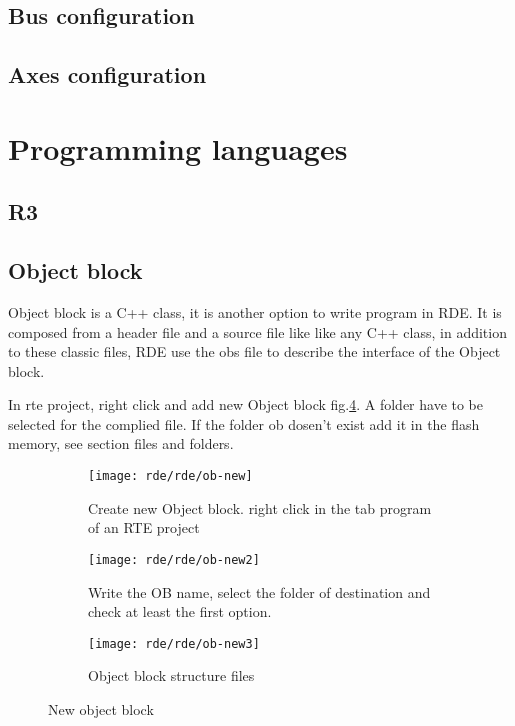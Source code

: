 %	
\subsection{Bus configuration}

%	
\subsection{Axes configuration}

%	 
\section{Programming languages}

%	
\subsection{R3}

%	
\subsection{Object block}
Object block is a C++ class, it is another option to write program in RDE. It is composed from a header file and a source file like like any C++ class, in addition to these classic files, RDE use the obs file to describe the interface of the Object block.

In rte project, right click and add new Object block fig.\ref{fig:obnew}. A folder have to be selected for the complied file. If the folder ob dosen't exist add it in the flash memory, see section files and folders.

\begin{figure}[h]
	\centering
	\begin{subfigure}{0.6\textwidth}
		\texttt{[image: rde/rde/ob-new]}
		\caption{Create new Object block. right click in the tab program of an RTE project}
		\label{fig:ob-new}
	\end{subfigure}
	\quad
	\begin{subfigure}{0.4\textwidth}
		\texttt{[image: rde/rde/ob-new2]}
		\caption{Write the OB name, select the folder of destination and check at least the first option.}
		\label{fig:ob-new2}
	\end{subfigure}
	\begin{subfigure}{0.4\textwidth}
		\texttt{[image: rde/rde/ob-new3]}
		\caption{Object block structure files}
		\label{fig:ob-new3}
	\end{subfigure}
	\caption{New object block}
	\label{fig:obnew}
\end{figure}

